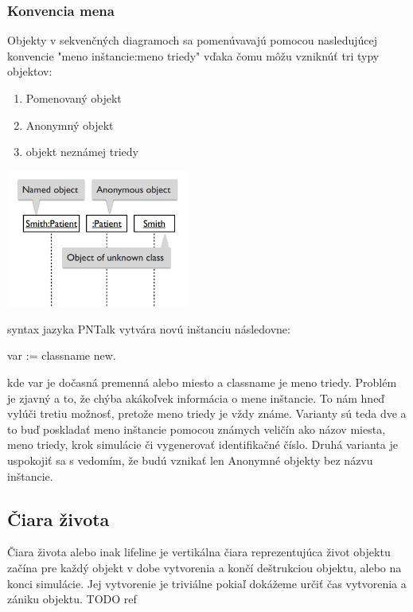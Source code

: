 \subsubsection*{Konvencia mena}

Objekty v sekvenčných diagramoch sa pomenúvavajú pomocou nasledujúcej konvencie "meno inštancie:meno triedy" vďaka čomu môžu vzniknúť tri typy objektov:


\begin{minipage}[c]{0.45\textwidth}
\begin{enumerate}
	\item Pomenovaný objekt
	\item Anonymný objekt
	\item objekt neznámej triedy
\end{enumerate}
\end{minipage}
\hfill
\begin{minipage}[c]{0.8\textwidth}
	\includegraphics[width=0.45\textwidth]{obrazky-figures/names}
\end{minipage}


syntax jazyka PNTalk vytvára novú inštanciu následovne:

var := classname new.

kde var je dočasná premenná alebo miesto a classname je meno triedy. Problém je zjavný a to, že chýba akákoľvek informácia o mene inštancie. To nám hneď vylúči tretiu možnosť, pretože meno triedy je vždy známe. Varianty sú teda dve a to buď poskladať meno inštancie pomocou známych veličín ako názov miesta, meno triedy, krok simulácie či vygenerovať identifikačné číslo. Druhá varianta je uspokojiť sa s vedomím, že budú vznikať len Anonymné objekty bez názvu inštancie.

\subsection*{Čiara života}
Čiara života alebo inak lifeline je vertikálna čiara reprezentujúca život objektu začína pre každý objekt v dobe vytvorenia a končí deštrukciou objektu, alebo na konci simulácie. Jej vytvorenie je triviálne pokiaľ dokážeme určiť čas vytvorenia a zániku objektu. TODO ref

